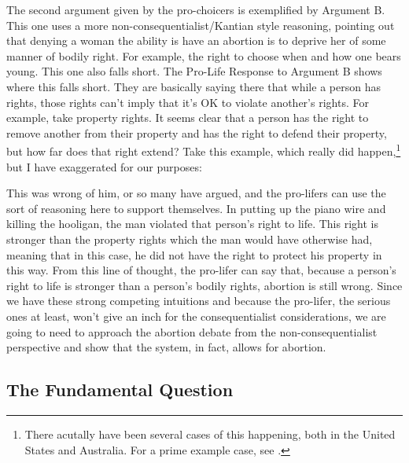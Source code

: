 The second argument given by the pro-choicers is exemplified by Argument B. This one uses a more non-consequentialist/Kantian style reasoning, pointing out that denying a woman the ability is have an abortion is to deprive her of some manner of bodily right. For example, the right to choose when and how one bears young. This one also falls short. The Pro-Life Response to Argument B shows where this falls short. They are basically saying there that while a person has rights, those rights can't imply that it's OK to violate another's rights. For example, take property rights. It seems clear that a person has the right to remove another from their property and has the right to defend their property, but how far does that right extend? Take this example, which really did happen,\footnote{There acutally have been several cases of this happening, both in the United States and Australia. For a prime example case, see .} but I have exaggerated for our purposes:


This was wrong of him, or so many have argued, and the pro-lifers can use the sort of reasoning here to support themselves. In putting up the piano wire and killing the hooligan, the man violated that person's right to life. This right is stronger than the property rights which the man would have otherwise had, meaning that in this case, he did not have the right to protect his property in this way.  From this line of thought, the pro-lifer can say that, because a person's right to life is stronger than a person's bodily rights, abortion is still wrong.  Since we have these strong competing intuitions and because the pro-lifer, the serious ones at least, won't give an inch for the consequentialist considerations, we are going to need to approach the abortion debate from the non-consequentialist perspective and show that the system, in fact, allows for abortion.
\subsection{The Fundamental Question}

